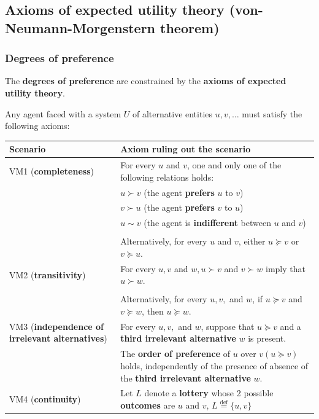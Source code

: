 \documentclass[11pt]{article}
\newcommand{\defequal}{\stackrel{\scriptscriptstyle\mathrm{def}}{=}}
\begin{document}
\subsection{Axioms of expected utility theory (von-Neumann-Morgenstern theorem)}
\label{sec:org0d34359}

\subsubsection{Degrees of preference}
\label{sec:org87af2a3}
The \textbf{degrees of preference} are constrained by the \textbf{axioms of expected utility theory}.

Any agent faced with a system \(U\) of alternative entities \(u, v, \ldots\) must satisfy the following axioms:
\begin{center}
\begin{tabular}{|m{7em}|m{25em}|}
\hline
Scenario & Axiom ruling out the scenario\\
\hline
VM1 (\textbf{completeness}) & For every \(u\) and \(v\), one and only one of the following relations holds:\\
 & \(u \succ v\) (the agent \textbf{prefers} \(u\) to \(v\))\\
 & \(v \succ u\) (the agent \textbf{prefers} \(v\) to \(u\))\\
 & \(u \sim v\) (the agent is \textbf{indifferent} between \(u\) and \(v\))\\
 & \\
 & Alternatively, for every \(u\) and \(v\), either \(u \succeq v\) or \(v \succeq u\).\\
\hline
VM2 (\textbf{transitivity}) & For every \(u, v\) and \(w, u \succ v\) and \(v \succ w\) imply that \(u \succ w\).\\
 & \\
 & Alternatively, for every \(u, v,\) and \(w\), if \(u \succeq v\) and \(v \succeq w\), then \(u \succeq w\).\\
\hline
VM3 (\textbf{independence of irrelevant alternatives}) & For every \(u, v,\) and \(w\), suppose that \(u \succeq v\) and a \textbf{third irrelevant alternative} \(w\) is present.\\
 & The \textbf{order of preference} of \(u\) over \(v (u \succeq v)\) holds, independently of the presence of absence of the \textbf{third irrelevant alternative} \(w\).\\
\hline
VM4 (\textbf{continuity}) & Let \(L\) denote a \textbf{lottery} whose 2 possible \textbf{outcomes} are \(u\) and \(v\), \(L \defequal \{u, v\}\)\\

\end{tabular}
\end{center}
\end{document}
